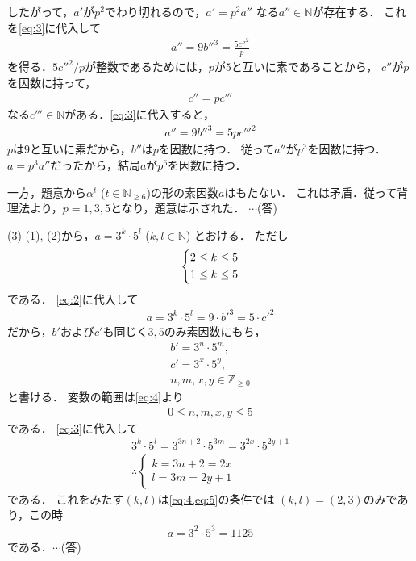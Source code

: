 \documentclass[a4paper,10pt]{ltjsarticle}
\begin{document}
\begin{multicols}{2}
  したがって，$a'$が$p^2$でわり切れるので，$a'=p^{2}a''$ なる$a'' \in \mathbb{N}$が存在する．
  これを\cref{eq:3}に代入して
  \begin{align*}
    a''=9b''^3 = \frac{5 c''^2}{p}
  \end{align*}
  を得る．$5c''^2/p$が整数であるためには，$p$が$5$と互いに素であることから，
  $c''$が$p$を因数に持って，
  \begin{align*}
    c'' = p c'''
  \end{align*}
  なる$c'''\in\mathbb{N}$がある．\cref{eq:3}に代入すると，
  \begin{align*}
    a''=9b''^3 = 5pc'''^2
  \end{align*}
  $p$は$9$と互いに素だから，$b''$は$p$を因数に持つ．
  従って$a''$が$p^3$を因数に持つ．
  $a=p^{3}a''$だったから，結局$a$が$p^6$を因数に持つ．

  一方，題意から$\alpha^t$ ($t \in \mathbb{N}_{\ge 6}$)の形の素因数$a$はもたない．
  これは矛盾．従って背理法より，$p=1,3,5$となり，題意は示された． $\cdots$(答)


  \vspace{10pt}
  (3)
  (1), (2)から，$a=3^k \cdot 5^l$ ($k,l \in \mathbb{N}$) とおける．
  ただし
  \begin{align}
    \begin{dcases}
      2 \le k \le 5 \\
      1 \le k \le 5
    \end{dcases} \label{eq:4}
  \end{align}
  である．
  \cref{eq:2}に代入して
  \begin{align}
    a = 3^k \cdot 5^l = 9 \cdot b'^3 = 5 \cdot c'^2\label{eq:3}
  \end{align}
  だから，$b'$および$c'$も同じく$3,5$のみ素因数にもち，
  \begin{align*}
    b'=3^n \cdot 5^m, \\
    c'=3^x \cdot 5^y, \\
    n,m,x,y \in \mathbb{Z}_{\ge 0}
  \end{align*}
  と書ける．
  変数の範囲は\cref{eq:4}より
  \begin{align}
    0 \le n,m,x,y \le 5 \label{eq:5}
  \end{align}
  である．
  \cref{eq:3}に代入して
  \begin{align*}
    3^k \cdot 5^l = 3^{3n+2} \cdot 5^{3m} = 3^{2x} \cdot 5^{2y+1} \\
    \therefore
    \begin{cases}
      k=3n+2=2x \\
      l=3m=2y+1
    \end{cases}
  \end{align*}
  である．
  これをみたす$(k,l)$は\cref{eq:4,eq:5}の条件では
  $(k,l)=(2,3)$のみであり，この時
  \begin{align*}
    a=3^2 \cdot 5^3 = 1125
  \end{align*}
  である．$\cdots$(答)
  \newpage
\end{multicols}
\end{document}
